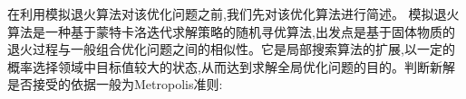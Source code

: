 在利用模拟退火算法对该优化问题之前,我们先对该优化算法进行简述。
模拟退火算法是一种基于蒙特卡洛迭代求解策略的随机寻优算法,出发点是基于固体物质的退火过程与一般组合优化问题之间的相似性。它是局部搜索算法的扩展,以一定的概率选择领域中目标值较大的状态,从而达到求解全局优化问题的目的。判断新解是否接受的依据一般为Metropolis准则:
